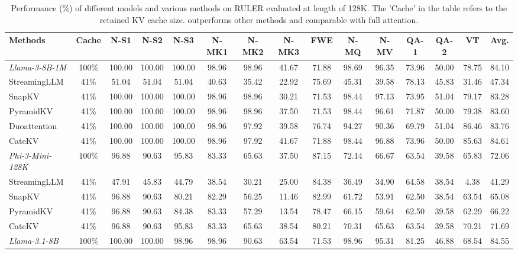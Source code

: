 \begin{table}[t]
\centering
\caption{Performance (\%) of different models and various methods on RULER evaluated at length of 128K. The 'Cache' in the table refers to the retained KV cache size. \shortname outperforms other methods and comparable with full attention. }
\setlength{\tabcolsep}{3pt} %
\small

\begin{tabular}{l|c|cccccccccccc|c}
\toprule
Methods & Cache & N-S1 & N-S2 & N-S3 & N-MK1 & N-MK2 & N-MK3 & FWE & N-MQ & N-MV & QA-1 & QA-2 & VT & Avg. \\ 
\midrule
\textit{Llama-3-8B-1M} & 100\% & 100.00 & 100.00 & 100.00 & 98.96 & 98.96 & 41.67 & 71.88 & 98.69 & 96.35 & 73.96 & 50.00 & 78.75 & 84.10 \\
StreamingLLM  & 41\% & 51.04 & 51.04 & 51.04 & 40.63 & 35.42 & 22.92 & 75.69 & 45.31 & 39.58 & 78.13 & 45.83 & 31.46 & 47.34 \\
SnapKV & 41\% & 100.00 & 100.00 & 100.00 & 98.96 & 98.96 & 30.21 & 71.53 & 98.44 & 97.13 & 73.95 & 51.04 & 79.17 & 83.28 \\
PyramidKV  & 41\% &100.00 &	100.00 &	100.00 & 98.96 & 98.96 & 37.50 & 71.53 &	98.44 &	96.61 &	71.87 &	50.00 &	79.38 & 83.60 \\
Duoattention & 41\% & 100.00 &	100.00 &	100.00 &	98.96 &	97.92 &	39.58 	&76.74& 	94.27 	&90.36 &	69.79 &	51.04 &	86.46 &	83.76 \\
\rowcolor{cyan!10}
CateKV  & 41\% & 100.00 & 100.00 & 100.00 & 98.96 & 97.92 & 41.67 & 71.88 & 98.44 & 96.88 & 73.96 & 50.00 & 85.63 & 84.61 \\
\midrule
\textit{Phi-3-Mini-128K} & 100\% & 96.88 & 90.63 & 95.83 & 83.33 & 65.63 & 37.50 & 87.15 & 72.14 & 66.67 & 63.54 & 39.58 & 65.83 & 72.06 \\
StreamingLLM & 41\% & 47.91 & 45.83 & 44.79 & 38.54 & 30.21 & 25.00 & 84.38 & 36.49 & 34.90 & 64.58 & 38.54 & 4.38 & 41.29 \\
SnapKV  & 41\% & 96.88 & 90.63 & 80.21	& 82.29 & 56.25 & 11.46 & 82.99 &	61.72 & 53.91 &	62.50 & 38.54 & 63.54 & 65.08 \\
PyramidKV  & 41\% & 96.88 &	90.63 &	84.38 &	83.33 &	57.29 &	13.54 &	78.47 &	66.15 &	59.64 &	62.50 &	39.58 & 62.29 & 66.22 \\
\rowcolor{cyan!10}
CateKV  & 41\% & 96.88 & 90.63 & 95.83 & 83.33 & 65.63 & 38.54 & 80.21 & 70.31 & 65.63 & 63.54 & 39.58 & 70.21 & 71.69 \\
\midrule
\textit{Llama-3.1-8B} & 100\% & 100.00 & 100.00 & 98.96 & 98.96 & 90.63 & 63.54 & 71.53 & 98.96 & 95.31 & 81.25 & 46.88 & 68.54 & 84.55 \\

\end{tabular}
\end{table}
